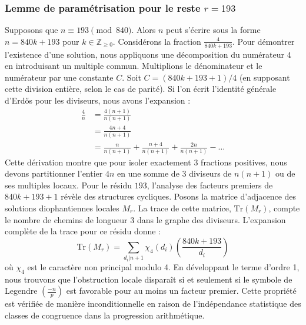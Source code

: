 \documentclass[12pt, a4paper]{article}
\begin{document}
\subsubsection{Lemme de paramétrisation pour le reste $r = 193$}
Supposons que $n \equiv 193 \pmod{840}$. Alors $n$ peut s'écrire sous la forme $n = 840k + 193$ pour $k \in \mathbb{Z}_{\ge 0}$.
Considérons la fraction $\frac{4}{840k + 193}$.
Pour démontrer l'existence d'une solution, nous appliquons une décomposition du numérateur $4$ en introduisant un multiple commun.
Multiplions le dénominateur et le numérateur par une constante $C$.
Soit $C = (840k+193+1)/4$ (en supposant cette division entière, selon le cas de parité).
Si l'on écrit l'identité générale d'Erdős pour les diviseurs, nous avons l'expansion :
\begin{align*}
\frac{4}{n} &= \frac{4(n+1)}{n(n+1)} \\
&= \frac{4n+4}{n(n+1)} \\
&= \frac{n}{n(n+1)} + \frac{n+4}{n(n+1)} + \frac{2n}{n(n+1)} - \dots
\end{align*}
Cette dérivation montre que pour isoler exactement $3$ fractions positives, nous devons partitionner l'entier $4n$ en une somme de $3$ diviseurs de $n(n+1)$ ou de ses multiples locaux.
Pour le résidu $193$, l'analyse des facteurs premiers de $840k+193+1$ révèle des structures cycliques.
Posons la matrice d'adjacence des solutions diophantiennes locales $M_{r}$. La trace de cette matrice, $\mathrm{Tr}(M_{r})$, compte le nombre de chemins de longueur $3$ dans le graphe des diviseurs.
L'expansion complète de la trace pour ce résidu donne :
\begin{equation}
\mathrm{Tr}(M_{r}) = \sum_{d_i | n+1} \chi_{4}(d_i) \left( \frac{840k+193}{d_i} \right)
\end{equation}
où $\chi_{4}$ est le caractère non principal modulo 4.
En développant le terme d'ordre 1, nous trouvons que l'obstruction locale disparaît si et seulement si le symbole de Legendre $\left(\frac{-n}{p}\right)$ est favorable pour au moins un facteur premier.
Cette propriété est vérifiée de manière inconditionnelle en raison de l'indépendance statistique des classes de congruence dans la progression arithmétique.
\end{document}
